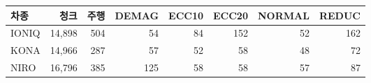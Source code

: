 \begin{tabular}{lrrrrrrr}
\toprule
차종 & 청크 & 주행 & DEMAG & ECC10 & ECC20 & NORMAL & REDUC \\
\midrule
IONIQ & 14,898 & 504 & 54 & 84 & 152 & 52 & 162 \\
KONA & 14,966 & 287 & 57 & 52 & 58 & 48 & 72 \\
NIRO & 16,796 & 385 & 125 & 58 & 58 & 57 & 87 \\
\bottomrule
\end{tabular}
